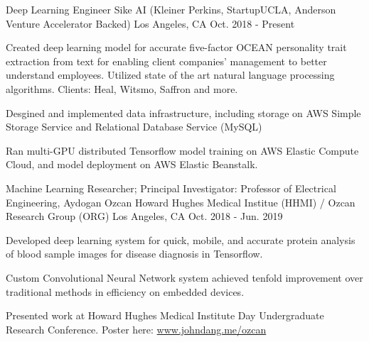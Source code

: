\begin{cventries}
  \cventry
    {Deep Learning Engineer} %
    {Sike AI (Kleiner Perkins, StartupUCLA, Anderson Venture Accelerator Backed)} %
    {Los Angeles, CA} %
    {Oct. 2018 - Present} %
    {
      \begin{cvitems} %
        \item {Created deep learning model for accurate five-factor OCEAN personality trait extraction from text for enabling 
        client companies' management to better understand employees. Utilized state of the art 
        natural language processing algorithms. Clients: Heal, Witsmo, Saffron and more.}
        \item {Desgined and implemented data infrastructure, including storage on AWS Simple Storage Service
         and Relational Database Service (MySQL)
        \item Ran multi-GPU distributed Tensorflow model training on AWS Elastic Compute Cloud, and model deployment on AWS Elastic Beanstalk.}
      \end{cvitems}
    }

  \cventry
    {Machine Learning Researcher; Principal Investigator: Professor of Electrical Engineering, Aydogan Ozcan} %
    {Howard Hughes Medical Institue (HHMI) / Ozcan Research Group (ORG)} %
    {Los Angeles, CA} %
    {Oct. 2018 - Jun. 2019} %
    {
      \begin{cvitems} %
        \item {Developed deep learning system for quick, mobile, and accurate protein analysis of blood sample images for disease diagnosis in Tensorflow.}
        \item {Custom Convolutional Neural Network system achieved tenfold improvement over traditional methods in efficiency on embedded devices.}
        \item Presented work at Howard Hughes Medical Institute Day Undergraduate Research Conference. Poster here: \href{https://www.johndang.me/ozcan}{www.johndang.me/ozcan}
      \end{cvitems}
    }


\end{cventries}
